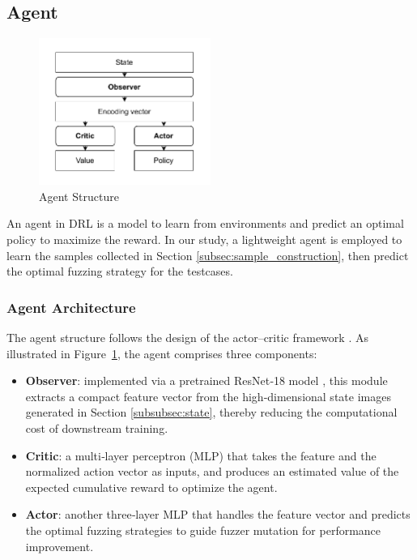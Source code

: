 \documentclass[lettersize,journal]{IEEEtran}
\begin{document}
\subsection{Agent}
\begin{figure}[t!]
	\centerline{\includegraphics[width=0.5\textwidth]{fig/agent_structure2.pdf}}
	\caption{Agent Structure}
	\label{fig:agent_structure}
\end{figure}
An agent in DRL is a model to learn from environments and predict an optimal policy to maximize the reward. In our study, a lightweight agent is employed to learn the samples collected in Section \ref{subsec:sample_construction}, then predict the optimal fuzzing strategy for the testcases.

\subsubsection{Agent Architecture}
The agent structure follows the design of the actor–critic framework \cite{bartoNeuronlikeAdaptiveElements1983}. As illustrated in Figure \ref{fig:agent_structure}, the agent comprises three components:
\begin{itemize}
	\item \textbf{Observer}: implemented via a pretrained ResNet‑18 model \cite{heDeepResidualLearning2016}, this module extracts a compact feature vector from the high‑dimensional state images generated in Section \ref{subsubsec:state}, thereby reducing the computational cost of downstream training.
	\item \textbf{Critic}: a multi‑layer perceptron (MLP) that takes the feature and the normalized action vector as inputs, and produces an estimated value of the expected cumulative reward to optimize the agent.
	\item \textbf{Actor}: another three‑layer MLP that handles the feature vector and predicts the optimal fuzzing strategies to guide fuzzer mutation for performance improvement.
\end{itemize}
\end{document}
